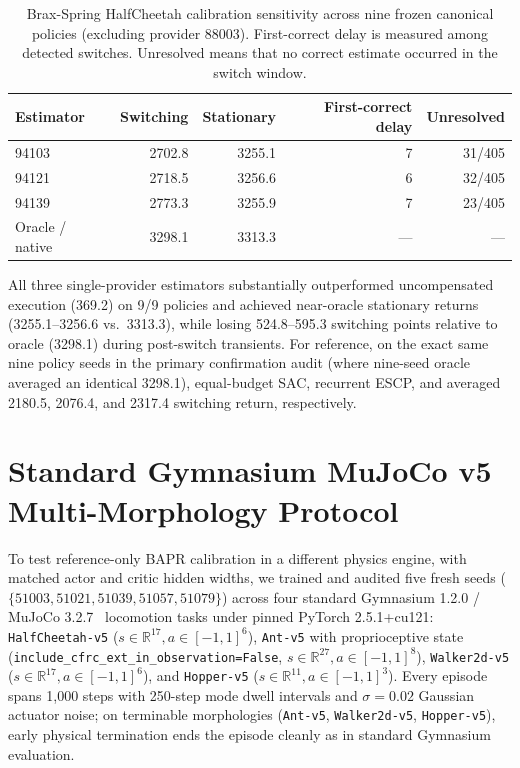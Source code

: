 \begin{table}[ht]
\centering
\small
\caption{Brax-Spring HalfCheetah calibration sensitivity across nine frozen canonical policies (excluding provider 88003). First-correct delay is measured among detected switches. Unresolved means that no correct estimate occurred in the switch window.}
\label{tab:hc_calibration_sensitivity}
\begin{tabular}{lrrrr}
\toprule
Estimator & Switching & Stationary & First-correct delay & Unresolved \\
\midrule
94103 & 2702.8 & 3255.1 & 7 & 31/405 \\
94121 & 2718.5 & 3256.6 & 6 & 32/405 \\
94139 & 2773.3 & 3255.9 & 7 & 23/405 \\
Oracle / native & 3298.1 & 3313.3 & --- & --- \\
\bottomrule
\end{tabular}
\end{table}

All three single-provider estimators substantially outperformed uncompensated execution (369.2) on 9/9 policies and achieved near-oracle stationary returns (3255.1--3256.6 vs.\ 3313.3), while losing 524.8--595.3 switching points relative to oracle (3298.1) during post-switch transients. For reference, on the exact same nine policy seeds in the primary confirmation audit (where nine-seed oracle averaged an identical 3298.1), equal-budget SAC, recurrent ESCP, and \resacbaseline{} averaged 2180.5, 2076.4, and 2317.4 switching return, respectively.

\section{Standard Gymnasium MuJoCo v5 Multi-Morphology Protocol}
\label{app:mujoco_v5_protocol}

To test reference-only BAPR calibration in a different physics engine, with matched actor and critic hidden widths, we trained and audited five fresh seeds ($\{51003,51021,51039,51057,51079\}$) across four standard Gymnasium 1.2.0 / MuJoCo 3.2.7~\citep{Todorov2012MuJoCo,Towers2024Gymnasium} locomotion tasks under pinned PyTorch 2.5.1+cu121: \texttt{HalfCheetah-v5} ($s\in\mathbb{R}^{17},a\in[-1,1]^6$), \texttt{Ant-v5} with proprioceptive state (\texttt{include\_\allowbreak cfrc\_\allowbreak ext\_\allowbreak in\_\allowbreak observation=\allowbreak False}, $s\in\mathbb{R}^{27},a\in[-1,1]^8$), \texttt{Walker2d-v5} ($s\in\mathbb{R}^{17},a\in[-1,1]^6$), and \texttt{Hopper-v5} ($s\in\mathbb{R}^{11},a\in[-1,1]^3$). Every episode spans 1,000 steps with 250-step mode dwell intervals and $\sigma=0.02$ Gaussian actuator noise; on terminable morphologies (\texttt{Ant-v5}, \texttt{Walker2d-v5}, \texttt{Hopper-v5}), early physical termination ends the episode cleanly as in standard Gymnasium evaluation.

